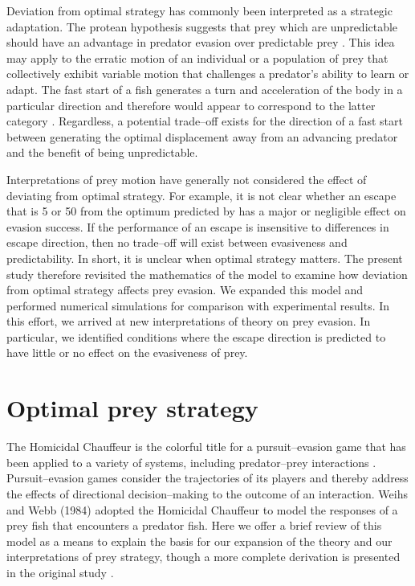 \documentclass[12pt]{article}
\begin{document}
Deviation from optimal strategy has commonly been interpreted as a strategic adaptation. The protean hypothesis suggests that prey which are unpredictable should have an advantage in predator evasion over predictable prey \citep{Humphries:1970hy}. 
This idea may apply to the erratic motion of an individual or a population of prey that collectively exhibit variable motion that challenges a predator's ability to learn or adapt. The fast start of a fish generates a turn and acceleration of the body in a particular direction and therefore would appear to correspond to the latter category \citep{D:1973up}. 
Regardless, a potential trade--off exists for the direction of a fast start between generating the optimal displacement away from an advancing predator and the benefit of being unpredictable.  

Interpretations of prey motion have generally not considered the effect of deviating from optimal strategy. For example, it is not clear whether an escape that is 5\textdegree\hspace{0.5pt} or 50\textdegree\hspace{0.5pt} from the optimum predicted by \cite{Weihs:1984tb} has a major or negligible effect on evasion success. 
If the performance of an escape is insensitive to differences in escape direction, then no trade--off will exist between evasiveness and predictability. In short, it is unclear when optimal strategy matters. 
The present study therefore revisited the mathematics of the \cite{Weihs:1984tb} model to examine how deviation from optimal strategy affects prey evasion. We expanded this model and performed numerical simulations for comparison with experimental results. In this effort, we arrived at new interpretations of theory on prey evasion. In particular, we identified conditions where the escape direction is predicted to have little or no effect on the evasiveness of prey.

\section{Optimal prey strategy}
\label{opt_strategy}

The Homicidal Chauffeur is the colorful title for a pursuit--evasion game that has been applied to a variety of systems, including predator--prey interactions \citep{Isaacs:1965va}. Pursuit--evasion games consider the trajectories of its players and thereby address the effects of directional decision--making to the outcome of an interaction. 
Weihs and Webb (1984) adopted the Homicidal Chauffeur to model the responses of a prey fish that encounters a predator fish. Here we offer a brief review of this model as a means to explain the basis for our expansion of the theory and our interpretations of prey strategy, though a more complete derivation is presented in the original study \citep{Weihs:1984tb}.
\end{document}
